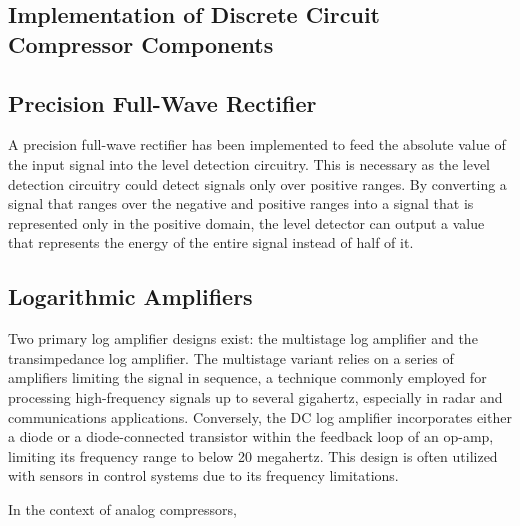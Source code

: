 \documentclass[10pt]{article}
\begin{document}
\begin{multicols*}{2}
        \section{Implementation of Discrete Circuit Compressor Components}

            \subsection{Precision Full-Wave Rectifier}
                A precision full-wave rectifier has been implemented to feed the absolute value of the input signal into the level detection circuitry. This is necessary as the level detection circuitry could detect signals only over positive ranges. By converting a signal that ranges over the negative and positive ranges into a signal that is represented only in the positive domain, the level detector can output a value that represents the energy of the entire signal instead of half of it.
                
            \subsection{Logarithmic Amplifiers} \label{sect:log-amp}
                Two primary log amplifier designs exist: the multistage log amplifier and the transimpedance log amplifier. The multistage variant relies on a series of amplifiers limiting the signal in sequence, a technique commonly employed for processing high-frequency signals up to several gigahertz, especially in radar and communications applications. Conversely, the DC log amplifier incorporates either a diode or a diode-connected transistor within the feedback loop of an op-amp, limiting its frequency range to below 20 megahertz. This design is often utilized with sensors in control systems due to its frequency limitations.\par
                In the context of analog compressors,  


\end{multicols*}
\end{document}
